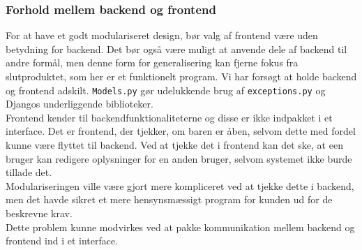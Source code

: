 \documentclass[]{article}
\begin{document}
\subsubsection{Forhold mellem backend og frontend}
\noindent For at have et godt modulariseret design, bør valg af frontend være uden betydning for backend. Det bør også være muligt at anvende dele af backend til andre formål, men denne form for generalisering kan fjerne fokus fra slutproduktet, som her er et funktionelt program.
Vi har forsøgt at holde backend og frontend adskilt. \texttt{Models.py} gør udelukkende brug af \texttt{exceptions.py} og Djangos underliggende biblioteker. \\
Frontend kender til backendfunktionaliteterne og disse er ikke indpakket i et interface. Det er frontend, der tjekker, om baren er åben, selvom dette med fordel kunne være flyttet til backend. Ved at tjekke det i frontend kan det ske, at een bruger kan redigere oplysninger for en anden bruger, selvom systemet ikke burde tillade det. \\
Modulariseringen ville være gjort mere kompliceret ved at tjekke dette i backend, men det havde sikret et mere hensynsmæssigt program for kunden ud for de beskrevne krav. \\
Dette problem kunne modvirkes ved at pakke kommunikation mellem backend og frontend ind i et interface.
\end{document}
